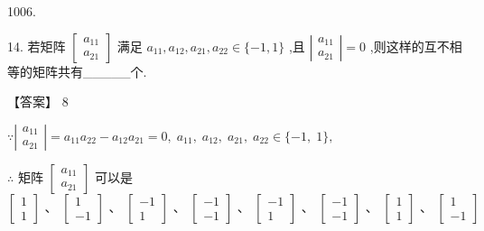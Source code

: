 \documentclass[10pt]{article}
\begin{document}
1006.

14. 若矩阵 \(\left\lbrack  \begin{array}{l} {a}_{11} \\  {a}_{21} \end{array}\right\rbrack\) 满足 \({a}_{11},{a}_{12},{a}_{21},{a}_{22} \in  \{  - 1,1\}\) ,且 \(\left| \begin{array}{l} {a}_{11} \\  {a}_{21} \end{array}\right|  = 0\) ,则这样的互不相等的矩阵共有\_\_\_\_\_个.

【答案】 8

\(\because \left| \begin{array}{l} {a}_{11} \\  {a}_{21} \end{array}\right|  = {a}_{11}{a}_{22} - {a}_{12}{a}_{21} = 0,\;{a}_{11},\;{a}_{12},\;{a}_{21},\;{a}_{22} \in  \{  - 1,\;1\} ,\)

\(\therefore\) 矩阵 \(\left\lbrack  \begin{array}{l} {a}_{11} \\  {a}_{21} \end{array}\right\rbrack\) 可以是 \(\left\lbrack  \begin{array}{l} 1 \\  1 \end{array}\right\rbrack  \text{ 、 }\left\lbrack  \begin{array}{l} 1 \\   - 1 \end{array}\right\rbrack  \text{ 、 }\left\lbrack  \begin{array}{l}  - 1 \\  1 \end{array}\right\rbrack  \text{ 、 }\left\lbrack  \begin{array}{l}  - 1 \\   - 1 \end{array}\right\rbrack  \text{ 、 }\left\lbrack  \begin{array}{l}  - 1 \\  1 \end{array}\right\rbrack  \text{ 、 }\left\lbrack  \begin{array}{l}  - 1 \\   - 1 \end{array}\right\rbrack  \text{ 、 }\left\lbrack  \begin{array}{l} 1 \\  1 \end{array}\right\rbrack  \text{ 、 }\left\lbrack  \begin{array}{l} 1 \\   - 1 \end{array}\right\rbrack\)
\end{document}
